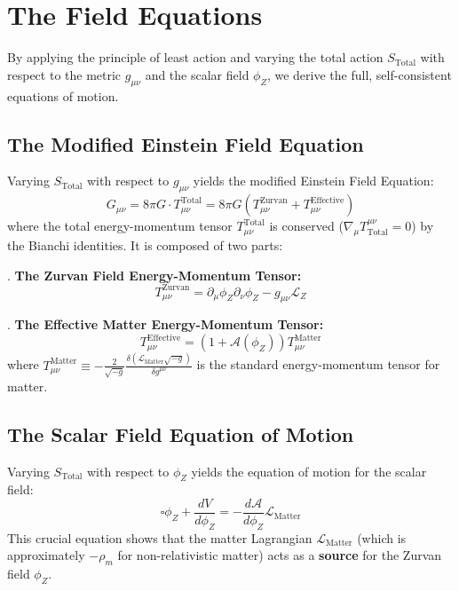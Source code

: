 \documentclass[12pt, a4paper]{article}
\newcommand{\phiZ}{\phi_Z}
\newcommand{\Lmat}{\mathcal{L}_{\text{Matter}}}
\newcommand{\Tmat}{T_{\mu\nu}^{\text{Matter}}}
\newcommand{\Teff}{T_{\mu\nu}^{\text{Effective}}}
\newcommand{\Tzurvan}{T_{\mu\nu}^{\text{Zurvan}}}
\newcommand{\Ttotal}{T_{\mu\nu}^{\text{Total}}}
\newcommand{\Aphi}{\mathcal{A}(\phiZ)}
\begin{document}
\section{The Field Equations}

By applying the principle of least action and varying the total action $S_{\text{Total}}$ with respect to the metric $g_{\mu\nu}$ and the scalar field $\phiZ$, we derive the full, self-consistent equations of motion.

\subsection{The Modified Einstein Field Equation}
Varying $S_{\text{Total}}$ with respect to $g_{\mu\nu}$ yields the modified Einstein Field Equation:
\begin{equation}
G_{\mu\nu} = 8\pi G \cdot \Ttotal = 8\pi G \left( \Tzurvan + \Teff \right)
\end{equation}
where the total energy-momentum tensor $\Ttotal$ is conserved ($\nabla_\mu T^{\mu\nu}_{\text{Total}} = 0$) by the Bianchi identities. It is composed of two parts:

. \textbf{The Zurvan Field Energy-Momentum Tensor:}
\begin{equation}
\Tzurvan = \partial_\mu \phiZ \partial_\nu \phiZ - g_{\mu\nu} \mathcal{L}_Z
\end{equation}

. \textbf{The Effective Matter Energy-Momentum Tensor:}
\begin{equation}
\Teff = (1 + \Aphi) \Tmat
\end{equation}
where $\Tmat \equiv -\frac{2}{\sqrt{-g}} \frac{\delta(\Lmat \sqrt{-g})}{\delta g^{\mu\nu}}$ is the standard energy-momentum tensor for matter.

\subsection{The Scalar Field Equation of Motion}
Varying $S_{\text{Total}}$ with respect to $\phiZ$ yields the equation of motion for the scalar field:
\begin{equation}
\square \phiZ + \frac{dV}{d\phiZ} = - \frac{d\mathcal{A}}{d\phiZ} \Lmat
\end{equation}
This crucial equation shows that the matter Lagrangian $\Lmat$ (which is approximately $-\rho_m$ for non-relativistic matter) acts as a \textbf{source} for the Zurvan field $\phiZ$.
\end{document}

